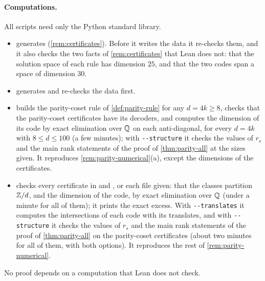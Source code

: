 \paragraph{Computations.} All scripts need only the Python standard library.
\begin{itemize}[leftmargin=1.5em]\raggedright
\item {} generates  (\cref{rem:certificates}). Before it
writes the data it re-checks them, and it also checks the two facts of \cref{rem:certificates} that Lean does not: that
the solution space of each rule has dimension $25$, and that the two codes span a space of dimension $30$.
\item {} generates  and re-checks the data first.
\item {} builds the parity-coset rule of \cref{def:parity-rule} for any $d=4k\ge8$,
checks that the parity-coset certificates have its decoders, and computes the dimension of its code by exact
elimination over $\mathbb{Q}$ on each anti-diagonal, for every $d=4k$ with $8\le d\le100$ (a few minutes); with
\texttt{-{}-structure} it checks the values of $r_s$ and the main rank statements of the proof of
\cref{thm:parity-all} at the sizes given. It
reproduces \cref{rem:parity-numerical}(a), except the dimensions of the certificates.
\item {} checks every certificate in  and
, or each file given: that the classes partition $\mathbb{Z}/d$, and the dimension of the code,
by exact elimination over $\mathbb{Q}$ (under a minute for all of them); it prints the exact excess. With
\texttt{-{}-translates} it computes the intersections of each code with its translates, and with
\texttt{-{}-structure} it checks the values of $r_s$ and the main rank statements of the proof of
\cref{thm:parity-all} on the parity-coset certificates (about two minutes for all of them, with both options). It reproduces the rest of
\cref{rem:parity-numerical}.
\end{itemize}
No proof depends on a computation that Lean does not check.
